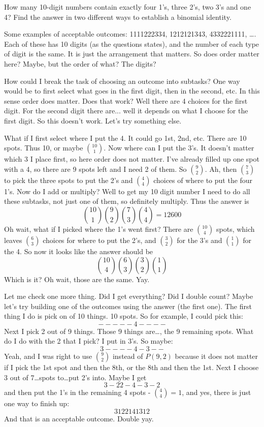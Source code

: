 \begin{questions}
\question[4] How many 10-digit numbers contain exactly four 1's, three 2's, two 3's and one 4?  Find the answer in two different ways to establish a binomial identity.
\begin{solution}

Some examples of acceptable outcomes: 1111222334, 1212121343, 4332221111, \ldots.  Each of these has 10 digits (as the questions states), and the number of each type of digit is the same.  It is just the arrangement that matters.  So does order matter here?  Maybe, but the order of what?  The digits?

How could I break the task of choosing an outcome into subtasks?  One way would be to first select what goes in the first digit, then in the second, etc.  In this sense order does matter.  Does that work?  Well there are 4 choices for the first digit.  For the second digit there are... well it depends on what I choose for the first digit.  So this doesn't work.  Let's try something else.

What if I first select where I put the 4.  It could go 1st, 2nd, etc.  There are 10 spots.  Thus 10, or maybe ${10 \choose 1}$.  Now where can I put the 3's.  It doesn't matter which 3 I place first, so here order does not matter.  I've already filled up one spot with a 4, so there are 9 spots left and I need 2 of them.  So ${9 \choose 2}$.  Ah, then ${7 \choose 3}$ to pick the three spots to put the 2's and ${4 \choose 4}$ choices of where to put the four 1's.  Now do I add or multiply?  Well to get my 10 digit number I need to do all these subtasks, not just one of them, so definitely multiply.  Thus the answer is
\[{10 \choose 1}{9 \choose 2}{7 \choose 3}{4 \choose 4} = 12600\]
Oh wait, what if I picked where the 1's went first?  There are ${10 \choose 4}$ spots, which leaves ${6 \choose 3}$ choices for where to put the 2's, and ${3 \choose 2}$ for the 3's and ${1 \choose 1}$ for the 4.  So now it looks like the answer should be
\[{10 \choose 4}{6 \choose 3}{3 \choose 2}{1 \choose 1}\]
Which is it?  Oh wait, those are the same.  Yay.

Let me check one more thing.  Did I get everything?  Did I double count?  Maybe let's try building one of the outcomes using the answer (the first one).  The first thing I do is pick on of 10 things.  10 spots.  So for example, I could pick this:
\[- - - - - ~ 4 - - - -\]
Next I pick 2 out of 9 things.  Those 9 things are\ldots, the 9 remaining spots.  What do I do with the 2 that I pick?  I put in 3's.  So maybe:
\[3 - - - - ~ 4 - 3 - -\]
Yeah, and I was right to use ${9 \choose 2}$ instead of $P(9,2)$ because it does not matter if I pick the 1st spot and then the 8th, or the 8th and then the 1st.  Next I choose 3 out of 7\ldots spots to\ldots put 2's into.  Maybe I get
\[3 - 2 2 - 4 - 3 - 2\]
and then put the 1's in the remaining 4 spots - ${4 \choose 4} = 1$, and yes, there is just one way to finish up:
\[3 1 22141312\]
And that is an acceptable outcome.  Double yay.
\end{solution}




\end{questions}

